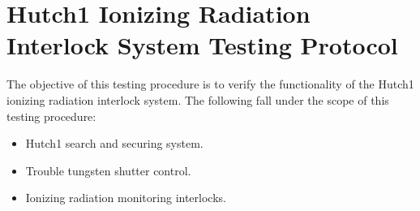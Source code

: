 \documentclass[letterpaper,10pt,english]{sphinxmanual}
\begin{document}
\section{Hutch\sphinxhyphen{}1 Ionizing Radiation Interlock System Testing Protocol}
\label{\detokenize{testing_documentation/Hutch-1_ionizing_radiation:hutch-1-ionizing-radiation-interlock-system-testing-protocol}}\label{\detokenize{testing_documentation/Hutch-1_ionizing_radiation::doc}}
\sphinxAtStartPar
The objective of this testing procedure is to verify the functionality of the Hutch\sphinxhyphen{}1 ionizing radiation interlock system.
The following fall under the scope of this testing procedure:
\begin{itemize}
\item {} 
\sphinxAtStartPar
Hutch\sphinxhyphen{}1 search and securing system.

\item {} 
\sphinxAtStartPar
Trouble tungsten shutter control.

\item {} 
\sphinxAtStartPar
Ionizing radiation monitoring interlocks.

\end{itemize}
\end{document}
